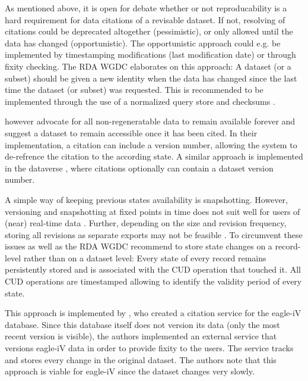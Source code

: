 \documentclass[letterpaper, parskip=half]{scrartcl}
\begin{document}
As mentioned above, it is open for debate whether or not reproducability is a hard requirement for data citations of a revisable dataset. If not, resolving of citations could be deprecated altogether (pessimistic), or only allowed until the data has changed (opportunistic). The opportunistic approach could e.g. be implemented by timestamping modifications (last modification date) or through fixity checking. The \gls{RDA} \gls{WGDC} \citep{Rauber2015} elaborates on this approach: A dataset (or a subset) should be given a new identity when the data has changed since the last time the dataset (or subset) was requested. This is recommended to be implemented through the use of a normalized query store and checksums \citep{Ball2015}.

\cite{Gray2002} however advocate for all non-regeneratable data to remain available forever and  \cite{Buneman2010} suggest a dataset to remain accessible once it has been cited. In their implementation, a citation can include a version number, allowing the system to de-refrence the citation to the according state. A similar approach is implemented in the dataverse \citep{Crosas2011}, where citations optionally can contain a dataset version number. 

A simple way of keeping previous states availability is snapshotting. However, versioning and snapshotting at fixed points in time does not suit well for users of (near) real-time data  \citep{Huber2015}. Further, depending on the size and revision frequency, storing all revisions as separate exports may not be feasible \citep{Rauber2015}. To circumvent these issues \cite{AltKin07} as well as the \gls{RDA} \gls{WGDC} \citep{Rauber2015a, Rauber2015, Proll2013} recommend to store state changes on a record-level rather than on a dataset level: Every state of every record remains persistently stored and is associated with the \gls{CUD} operation that touched it. All \gls{CUD} operations are timestamped allowing to identify the validity period of every state.

This approach is implemented by \cite{Alawini2017}, who created a citation service for the eagle-iV database. Since this database itself does not version its data (only the most recent version is visible), the authors implemented an external service that versions eagle-iV data in order to provide fixity to the users. The service tracks and stores every change in the original dataset.  The authors note that this approach is viable for eagle-iV since the dataset changes very slowly.
\end{document}
